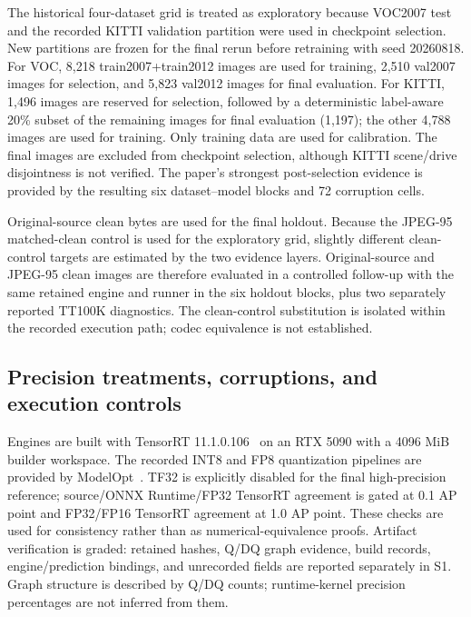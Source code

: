 \documentclass[a4paper,fleqn]{cas-dc}
\begin{document}
\begin{table}[t]
\centering
\caption{Evaluation datasets in the exploratory grid, not the separate final holdouts. Counts are taken from the converted annotations consumed by the evaluator.}
\label{tab:datasets}
\small
\setlength{\tabcolsep}{3pt}
\renewcommand{\arraystretch}{1.18}

\end{table}

The historical four-dataset grid is treated as exploratory because VOC2007 test and the recorded KITTI validation partition were used in checkpoint selection. New partitions are frozen for the final rerun before retraining with seed 20260818. For VOC, 8,218 train2007+train2012 images are used for training, 2,510 val2007 images for selection, and 5,823 val2012 images for final evaluation. For KITTI, 1,496 images are reserved for selection, followed by a deterministic label-aware 20\% subset of the remaining images for final evaluation (1,197); the other 4,788 images are used for training. Only training data are used for calibration. The final images are excluded from checkpoint selection, although KITTI scene/drive disjointness is not verified. The paper's strongest post-selection evidence is provided by the resulting six dataset--model blocks and 72 corruption cells.

Original-source clean bytes are used for the final holdout. Because the JPEG-95 matched-clean control is used for the exploratory grid, slightly different clean-control targets are estimated by the two evidence layers. Original-source and JPEG-95 clean images are therefore evaluated in a controlled follow-up with the same retained engine and runner in the six holdout blocks, plus two separately reported TT100K diagnostics. The clean-control substitution is isolated within the recorded execution path; codec equivalence is not established.

\subsection{Precision treatments, corruptions, and execution controls}
\label{sec:precision-treatments}
\label{sec:corruptions}
\label{sec:controlled-clean}

Engines are built with TensorRT 11.1.0.106~\citep{nvidia2026tensorrt} on an RTX 5090 with a 4096 MiB builder workspace. The recorded INT8 and FP8 quantization pipelines are provided by ModelOpt~\citep{nvidia2026modelopt}. TF32 is explicitly disabled for the final high-precision reference; source/ONNX Runtime/FP32 TensorRT agreement is gated at 0.1 AP point and FP32/FP16 TensorRT agreement at 1.0 AP point. These checks are used for consistency rather than as numerical-equivalence proofs. Artifact verification is graded: retained hashes, Q/DQ graph evidence, build records, engine/prediction bindings, and unrecorded fields are reported separately in S1. Graph structure is described by Q/DQ counts; runtime-kernel precision percentages are not inferred from them.
\end{document}
